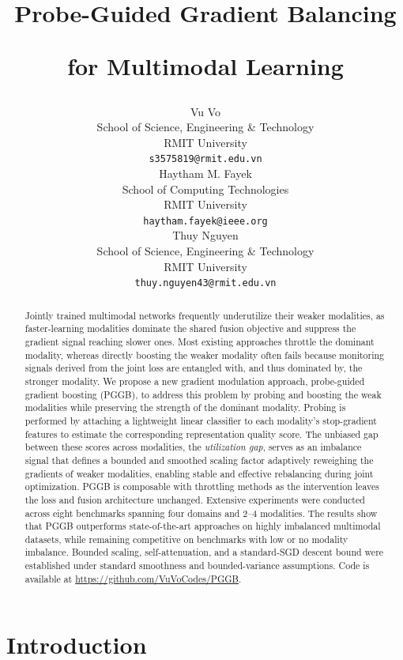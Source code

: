 \documentclass{article}
\title{Probe-Guided Gradient Balancing 

for Multimodal Learning}
\author{%
  Vu Vo \\
  School of Science, Engineering \& Technology \\
  RMIT University \\
  \texttt{s3575819@rmit.edu.vn} \\
  \And
  Haytham M. Fayek \\
  School of Computing Technologies \\
  RMIT University \\
  \texttt{haytham.fayek@ieee.org} \\
  \And
  Thuy Nguyen \\
  School of Science, Engineering \& Technology \\
  RMIT University \\
  \texttt{thuy.nguyen43@rmit.edu.vn} \\
}
\begin{document}
\maketitle


\begin{abstract}

Jointly trained multimodal networks frequently underutilize their weaker modalities, as faster-learning modalities dominate the shared fusion objective and suppress the gradient signal reaching slower ones. Most existing approaches throttle the dominant modality, whereas directly boosting the weaker modality often fails because monitoring signals derived from the joint loss are entangled with, and thus dominated by, the stronger modality.
We propose a new gradient modulation approach, probe-guided gradient boosting (PGGB), to address this problem by probing and boosting the weak modalities while preserving the strength of the dominant modality. 
Probing is performed by attaching a lightweight linear classifier to each modality’s stop-gradient features to estimate the corresponding representation quality score. The unbiased gap between these scores across modalities, the \emph{utilization gap}, serves as an imbalance signal that defines a bounded and smoothed scaling factor adaptively reweighing the gradients of weaker modalities, enabling stable and effective rebalancing during joint optimization.
PGGB is composable with throttling methods as the intervention leaves the loss and fusion architecture unchanged. 
Extensive experiments were conducted across eight benchmarks spanning four domains and 2–4 modalities. The results show that PGGB outperforms state-of-the-art approaches on highly imbalanced multimodal datasets, while remaining competitive on benchmarks with low or no modality imbalance.
Bounded scaling, self-attenuation, and a standard-SGD descent bound were established under standard smoothness and bounded-variance assumptions. 
Code is available at \url{https://github.com/VuVoCodes/PGGB}.
\end{abstract}

\section{Introduction}
\label{sec:intro}

\end{document}

